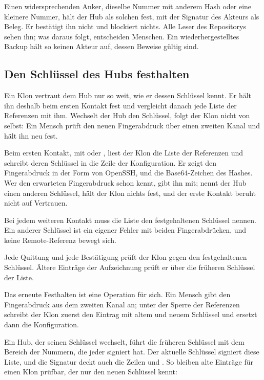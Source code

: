 Einen widersprechenden Anker, dieselbe Nummer mit anderem Hash oder eine kleinere Nummer, hält
der Hub als solchen fest, mit der Signatur des Akteurs als Beleg.
Er bestätigt ihn nicht und blockiert nichts.
Alle Leser des Repositorys sehen ihn; was daraus folgt, entscheiden Menschen.
Ein wiederhergestelltes Backup hält so keinen Akteur auf, dessen Beweise gültig sind.

\subsection[sec:hub-key-pin]{Den Schlüssel des Hubs festhalten}

Ein Klon vertraut dem Hub nur so weit, wie er dessen Schlüssel kennt.
Er hält ihn deshalb beim ersten Kontakt fest und vergleicht danach jede Liste der Referenzen mit
ihm.
Wechselt der Hub den Schlüssel, folgt der Klon nicht von selbst: Ein Mensch prüft den neuen
Fingerabdruck über einen zweiten Kanal und hält ihn neu fest.

\startitemize[n]
\item Beim ersten Kontakt, mit  oder , liest der Klon die Liste der
Referenzen und schreibt deren Schlüssel in die Zeile  der Konfiguration.
Er zeigt den Fingerabdruck in der Form von OpenSSH,  und die Base64-Zeichen des
Hashes.
Wer den erwarteten Fingerabdruck schon kennt, gibt ihn mit; nennt der Hub einen anderen
Schlüssel, hält der Klon nichts fest, und der erste Kontakt beruht nicht auf Vertrauen.
\item Bei jedem weiteren Kontakt muss die Liste den festgehaltenen Schlüssel nennen.
Ein anderer Schlüssel ist ein eigener Fehler mit beiden Fingerabdrücken, und keine
Remote-Referenz bewegt sich.
\item Jede Quittung und jede Bestätigung prüft der Klon gegen den festgehaltenen Schlüssel.
Ältere Einträge der Aufzeichnung prüft er über die früheren Schlüssel der Liste.
\item Das erneute Festhalten ist eine Operation für sich.
Ein Mensch gibt den Fingerabdruck aus dem zweiten Kanal an; unter der Sperre der Referenzen
schreibt der Klon zuerst den Eintrag  mit altem und neuem Schlüssel und ersetzt
dann die Konfiguration.
\stopitemize

Ein Hub, der seinen Schlüssel wechselt, führt die früheren Schlüssel mit dem Bereich der
Nummern, die jeder signiert hat.
Der aktuelle Schlüssel signiert diese Liste, und die Signatur deckt auch die Zeilen
 und .
So bleiben alte Einträge für einen Klon prüfbar, der nur den neuen Schlüssel kennt:

